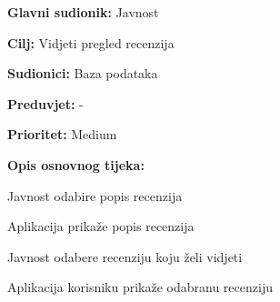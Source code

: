 \noindent {}
	\begin{packed_item}
	
		\item \textbf{Glavni sudionik: }Javnost
		\item  \textbf{Cilj:} Vidjeti pregled recenzija
		\item  \textbf{Sudionici:} Baza podataka
		\item  \textbf{Preduvjet:} -
		\item  \textbf{Prioritet:} Medium
		\item  \textbf{Opis osnovnog tijeka:}
		
		\item[] \begin{packed_enum}
			\item Javnost odabire popis recenzija
			\item Aplikacija prikaže popis recenzija
			\item Javnost odabere recenziju koju želi vidjeti
			\item Aplikacija korisniku prikaže odabranu recenziju
		\end{packed_enum}
	\end{packed_item}


